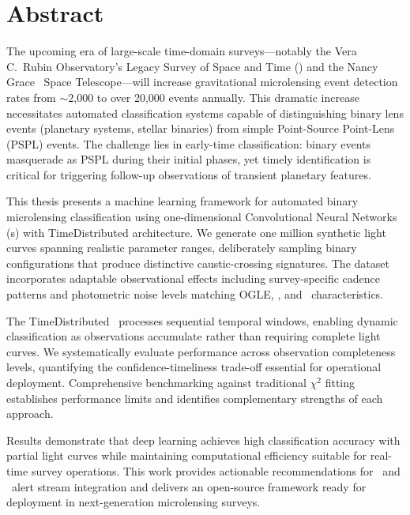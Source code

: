 
\cleardoublepage
\thispagestyle{empty}

\vspace*{50pt}

\section*{Abstract}

The upcoming era of large-scale time-domain surveys---notably the Vera C.~Rubin Observatory's Legacy Survey of Space and Time (\lsst) and the Nancy Grace \romantel\ Space Telescope---will increase gravitational microlensing event detection rates from $\sim$2,000 to over 20,000 events annually. This dramatic increase necessitates automated classification systems capable of distinguishing binary lens events (planetary systems, stellar binaries) from simple Point-Source Point-Lens (PSPL) events. The challenge lies in early-time classification: binary events masquerade as PSPL during their initial phases, yet timely identification is critical for triggering follow-up observations of transient planetary features.

This thesis presents a machine learning framework for automated binary microlensing classification using one-dimensional Convolutional Neural Networks (\cnn s) with TimeDistributed architecture. We generate one million synthetic light curves spanning realistic parameter ranges, deliberately sampling binary configurations that produce distinctive caustic-crossing signatures. The dataset incorporates adaptable observational effects including survey-specific cadence patterns and photometric noise levels matching OGLE, \lsst, and \romantel\ characteristics.

The TimeDistributed \cnn\ processes sequential temporal windows, enabling dynamic classification as observations accumulate rather than requiring complete light curves. We systematically evaluate performance across observation completeness levels, quantifying the confidence-timeliness trade-off essential for operational deployment. Comprehensive benchmarking against traditional $\chi^2$ fitting establishes performance limits and identifies complementary strengths of each approach.

Results demonstrate that deep learning achieves high classification accuracy with partial light curves while maintaining computational efficiency suitable for real-time survey operations. This work provides actionable recommendations for \lsst\ and \romantel\ alert stream integration and delivers an open-source framework ready for deployment in next-generation microlensing surveys.

\vspace{1cm}

\cleardoublepage

